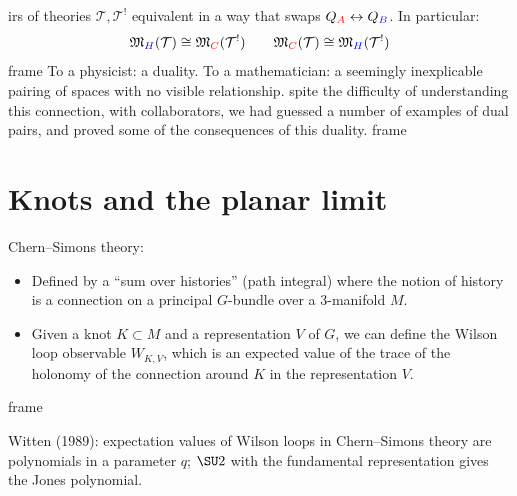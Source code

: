 \documentclass[presentation]{beamer}
\newenvironment{block}
\newenvironment{frame}
\theoremstyle{remark}
\begin{document}
\begin{frame}
  \begin{block}{ 3d mirror symmetry (Intriligator--Seiberg, 1996)}  pairs of
  theories $\mathcal{T},\mathcal{T}^!$ equivalent in a way that swaps
  $Q_{\color{red} A}\leftrightarrow Q_{\color{blue} B}$.  In
  particular:
  \[\mathfrak{M}_{\color{blue}H}(\mathcal{T})\cong \mathfrak{M}_{\color{red}C}(\mathcal{T}^!)\qquad
    \mathfrak{M}_{\color{red}C}(\mathcal{T})\cong \mathfrak{M}_{\color{blue}H}(\mathcal{T}^!)\]
    \end{block}
  To a physicist: a duality.  To a mathematician: a seemingly inexplicable pairing of spaces with no visible relationship.
\begin{block}{}
  Despite the difficulty of understanding this connection, with collaborators, we had guessed a number of examples of dual pairs, and proved some of the consequences of this duality.
\end{block}
\end{frame}


\section{Knots and the planar limit}

\begin{frame}
    \begin{block}{}
  Chern--Simons theory:
  \begin{itemize}
    \item Defined by a ``sum over histories'' (path integral) where the notion of history is a connection on a principal $G$-bundle over a 3-manifold $M$.
    \item Given a knot $K\subset M$ and a representation $V$ of $G$, we can define the Wilson loop observable $W_{K,V}$, which is an expected value of the trace of the holonomy of the connection around $K$ in the representation $V$.
  \end{itemize}  
  \end{block}  

  Witten (1989): expectation values of Wilson loops in Chern--Simons
  theory are polynomials in a parameter $q$; $\SU2$ with the fundamental
  representation gives the Jones polynomial.

  \vspace{1in}


\end{frame}
\end{document}
